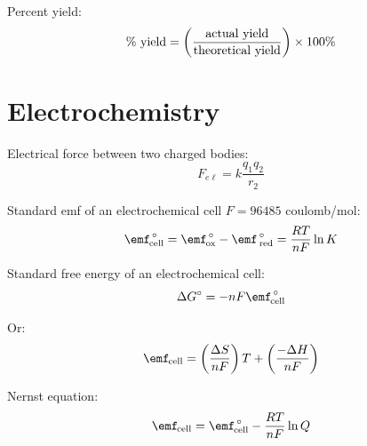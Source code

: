 \documentclass[10pt]{article}
\begin{document}
Percent yield:
\begin{equation*}
\textnormal{\% yield} = \left(\frac{\textnormal{actual yield}}{\textnormal{theoretical yield}}\right)\times 100\%
\end{equation*}


\section{Electrochemistry}


Electrical force between two charged bodies:
\begin{equation*}
F_{e\ell}=k\frac{q_1q_2}{r_2}
\end{equation*}

Standard emf of an electrochemical cell $F=96485$ coulomb/mol:
\begin{equation*}
\textnormal{\Enotcell} = \textnormal{$\emf^{\hspace*{.5mm}\circ}_{\hspace*{-.3mm}\textnormal{ox}}$} - \textnormal{$\emf^{\hspace*{.5mm}\circ}_{\hspace*{.5mm}\textnormal{red}}$}  = \frac{RT}{nF} \ln K
\end{equation*}

Standard free energy of an electrochemical cell:
\begin{equation*}
\Delta G\not = -nF\textnormal{\Enotcell}
\end{equation*}

Or:
\begin{equation*}
\text{\Ecell} = \left(\frac{\Delta S}{nF}\right)T + \left(\frac{-\Delta H}{nF}\right)
\end{equation*}

Nernst equation:
\begin{equation*}
\textnormal{\Ecell} = \textnormal{\Enotcell} - \frac{RT}{nF}\ln Q
\end{equation*}
\end{document}
